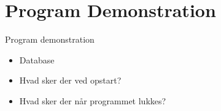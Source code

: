 \section{Program Demonstration}

\begin{frame}{Program demonstration}
	
	\begin{itemize}
		\item Database 
		\item Hvad sker der ved opstart?
		\item Hvad sker der når programmet lukkes?
	\end{itemize}

	
\end{frame}